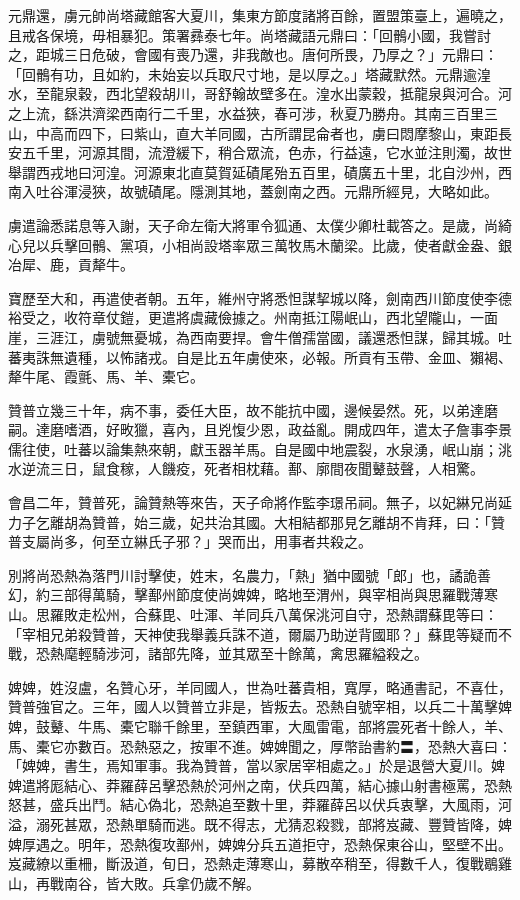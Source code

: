 \begin{pinyinscope}
 元鼎還，虜元帥尚塔藏館客大夏川，集東方節度諸將百餘，置盟策臺上，遍曉之，且戒各保境，毋相暴犯。策署彞泰七年。尚塔藏語元鼎曰：「回鶻小國，我嘗討之，距城三日危破，會國有喪乃還，非我敵也。唐何所畏，乃厚之？」元鼎曰：「回鶻有功，且如約，未始妄以兵取尺寸地，是以厚之。」塔藏默然。元鼎逾湟水，至龍泉穀，西北望殺胡川，哥舒翰故壁多在。湟水出蒙穀，抵龍泉與河合。河之上流，繇洪濟梁西南行二千里，水益狹，春可涉，秋夏乃勝舟。其南三百里三山，中高而四下，曰紫山，直大羊同國，古所謂昆侖者也，虜曰悶摩黎山，東距長安五千里，河源其間，流澄緩下，稍合眾流，色赤，行益遠，它水並注則濁，故世舉謂西戎地曰河湟。河源東北直莫賀延磧尾殆五百里，磧廣五十里，北自沙州，西南入吐谷渾浸狹，故號磧尾。隱測其地，蓋劍南之西。元鼎所經見，大略如此。



 虜遣論悉諾息等入謝，天子命左衛大將軍令狐通、太僕少卿杜載答之。是歲，尚綺心兒以兵擊回鶻、黨項，小相尚設塔率眾三萬牧馬木蘭梁。比歲，使者獻金盎、銀冶犀、鹿，貢犛牛。



 寶歷至大和，再遣使者朝。五年，維州守將悉怛謀挈城以降，劍南西川節度使李德裕受之，收符章仗鎧，更遣將虞藏儉據之。州南抵江陽岷山，西北望隴山，一面崖，三涯江，虜號無憂城，為西南要捍。會牛僧孺當國，議還悉怛謀，歸其城。吐蕃夷誅無遺種，以怖諸戎。自是比五年虜使來，必報。所貢有玉帶、金皿、獺褐、犛牛尾、霞氈、馬、羊、橐它。



 贊普立幾三十年，病不事，委任大臣，故不能抗中國，邊候晏然。死，以弟達磨嗣。達磨嗜酒，好畋獵，喜內，且兇愎少恩，政益亂。開成四年，遣太子詹事李景儒往使，吐蕃以論集熱來朝，獻玉器羊馬。自是國中地震裂，水泉湧，岷山崩；洮水逆流三日，鼠食稼，人饑疫，死者相枕藉。鄯、廓間夜聞鼙鼓聲，人相驚。



 會昌二年，贊普死，論贊熱等來告，天子命將作監李璟吊祠。無子，以妃綝兄尚延力子乞離胡為贊普，始三歲，妃共治其國。大相結都那見乞離胡不肯拜，曰：「贊普支屬尚多，何至立綝氏子邪？」哭而出，用事者共殺之。



 別將尚恐熱為落門川討擊使，姓末，名農力，「熱」猶中國號「郎」也，譎詭善幻，約三部得萬騎，擊鄯州節度使尚婢婢，略地至渭州，與宰相尚與思羅戰薄寒山。思羅敗走松州，合蘇毘、吐渾、羊同兵八萬保洮河自守，恐熱謂蘇毘等曰：「宰相兄弟殺贊普，天神使我舉義兵誅不道，爾屬乃助逆背國耶？」蘇毘等疑而不戰，恐熱麾輕騎涉河，諸部先降，並其眾至十餘萬，禽思羅縊殺之。



 婢婢，姓沒盧，名贊心牙，羊同國人，世為吐蕃貴相，寬厚，略通書記，不喜仕，贊普強官之。三年，國人以贊普立非是，皆叛去。恐熱自號宰相，以兵二十萬擊婢婢，鼓鼙、牛馬、橐它聯千餘里，至鎮西軍，大風雷電，部將震死者十餘人，羊、馬、橐它亦數百。恐熱惡之，按軍不進。婢婢聞之，厚幣詒書約〓，恐熱大喜曰：「婢婢，書生，焉知軍事。我為贊普，當以家居宰相處之。」於是退營大夏川。婢婢遣將厖結心、莽羅薛呂擊恐熱於河州之南，伏兵四萬，結心據山射書極罵，恐熱怒甚，盛兵出鬥。結心偽北，恐熱追至數十里，莽羅薛呂以伏兵衷擊，大風雨，河溢，溺死甚眾，恐熱單騎而逃。既不得志，尤猜忍殺戮，部將岌藏、豐贊皆降，婢婢厚遇之。明年，恐熱復攻鄯州，婢婢分兵五道拒守，恐熱保東谷山，堅壁不出。岌藏繚以重柵，斷汲道，旬日，恐熱走薄寒山，募散卒稍至，得數千人，復戰鶡雞山，再戰南谷，皆大敗。兵拿仍歲不解。




\end{pinyinscope}
